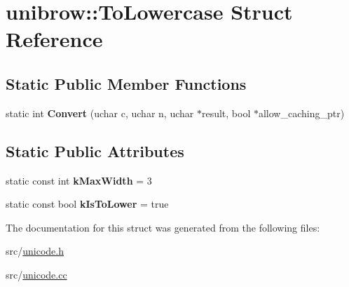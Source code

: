 \hypertarget{structunibrow_1_1_to_lowercase}{}\section{unibrow\+:\+:To\+Lowercase Struct Reference}
\label{structunibrow_1_1_to_lowercase}
\subsection*{Static Public Member Functions}
\begin{DoxyCompactItemize}
\item 
\hypertarget{structunibrow_1_1_to_lowercase_a3dee260f86f4c06840bd71d2bb2f2345}{}static int {\bfseries Convert} (uchar c, uchar n, uchar $\ast$result, bool $\ast$allow\+\_\+caching\+\_\+ptr)\label{structunibrow_1_1_to_lowercase_a3dee260f86f4c06840bd71d2bb2f2345}

\end{DoxyCompactItemize}
\subsection*{Static Public Attributes}
\begin{DoxyCompactItemize}
\item 
\hypertarget{structunibrow_1_1_to_lowercase_a6e41e8feb6ea32c6a4737764fc948b21}{}static const int {\bfseries k\+Max\+Width} = 3\label{structunibrow_1_1_to_lowercase_a6e41e8feb6ea32c6a4737764fc948b21}

\item 
\hypertarget{structunibrow_1_1_to_lowercase_a225c76e5328e1c3bdb96438b0f751f44}{}static const bool {\bfseries k\+Is\+To\+Lower} = true\label{structunibrow_1_1_to_lowercase_a225c76e5328e1c3bdb96438b0f751f44}

\end{DoxyCompactItemize}


The documentation for this struct was generated from the following files\+:\begin{DoxyCompactItemize}
\item 
src/\hyperlink{unicode_8h}{unicode.\+h}\item 
src/\hyperlink{unicode_8cc}{unicode.\+cc}\end{DoxyCompactItemize}
